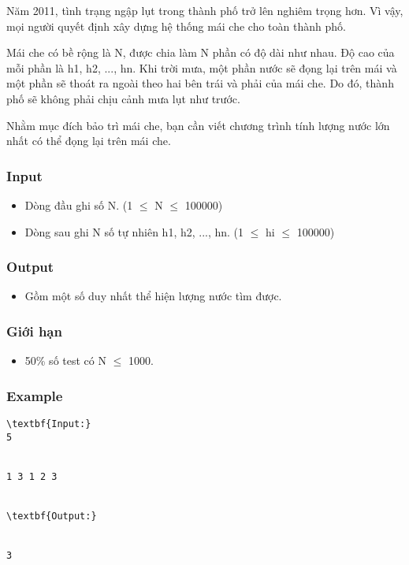 



   Năm 2011, tình trạng ngập lụt trong thành phố trở lên nghiêm trọng hơn. Vì vậy, mọi người quyết định xây dựng hệ thống mái che cho toàn thành phố.  




   Mái che có bề rộng là N, được chia làm N phần có độ dài như nhau. Độ cao của mỗi phần là h1, h2, ..., hn. Khi trời mưa, một phần nước sẽ đọng lại trên mái và một phần sẽ thoát ra ngoài theo hai bên trái và phải của mái che. Do đó, thành phố sẽ không phải chịu cảnh mưa lụt như trước.  




   Nhằm mục đích bảo trì mái che, bạn cần viết chương trình tính lượng nước lớn nhất có thể đọng lại trên mái che.  

\subsubsection{   Input  }
\begin{itemize}
	\item     Dòng đầu ghi số N. (1  $\le$  N  $\le$  100000)   
\end{itemize}
\begin{itemize}
	\item     Dòng sau ghi N số tự nhiên h1, h2, ..., hn. (1  $\le$  hi  $\le$  100000)   
\end{itemize}

\subsubsection{   Output  }
\begin{itemize}
	\item     Gồm một số duy nhất thể hiện lượng nước tìm được.   
\end{itemize}

\subsubsection{   Giới hạn  }
\begin{itemize}
	\item     50\% số test có N  $\le$  1000.   
\end{itemize}

\subsubsection{   Example  }
\begin{verbatim}
\textbf{Input:}
5


1 3 1 2 3


\textbf{Output:}


3\end{verbatim}
